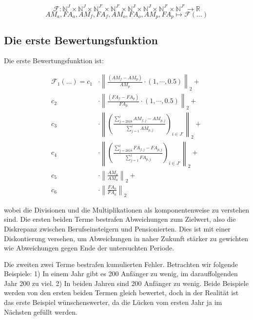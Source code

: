 \documentclass[a4paper,12pt]{article}
\begin{document}
\begin{equation*}
\mathcal F: \mathbb{N}^J \times \mathbb{N}^J \times \mathbb{N}^{J'} \times \mathbb{N}^{J'} \times \mathbb{N}^{J} \times \mathbb{N}^{J} \times \mathbb{N}^{J'} \times \mathbb{N}^{J'} \rightarrow \mathbb R
\end{equation*}
\begin{equation*}
AM_a, FA_a, AM_f, FA_f, AM_o, FA_o, AM_p, FA_p \mapsto \mathcal F(\hdots)
\end{equation*}




\subsection{Die erste Bewertungsfunktion}

Die erste Bewertungsfunktion ist:

\begin{align*}
\mathcal F_1(\hdots) = c_1 &\cdot \left\| \frac{(AM_f - AM_p)}{AM_p} \cdot (1, \cdots, 0.5)  \right\|_2 + \\
			  c_2 &\cdot \left\| \frac{(FA_f - FA_p)}{FA_p} \cdot (1, \cdots, 0.5)  \right\|_2  +\\
			  c_3 &\cdot \left\| \left( \frac{ \sum\nolimits_{j=2018}^i AM_{f,j} - AM_{p,j} }{\sum\nolimits_{j=1}^i AM_{p,j} } \right)_{i\in J'} \right\|_2 +\\
			  c_4 &\cdot \left\| \left( \frac{ \sum\nolimits_{j=2018}^i FA_{f,j} - FA_{p,j} }{\sum\nolimits_{j=1}^i FA_{p,j} } \right)_{i\in J'} \right\|_2 +\\
			  c_5 &\cdot \left\| \frac{AM_o}{AM_a} \right\|_2 +\\
			  c_6 &\cdot \left\| \frac{FA_o}{FA_a} \right\|_2 
\end{align*}

wobei die Divisionen und die Multiplikationen als komponentenweise zu verstehen sind. Die ersten beiden Terme bestrafen Abweichungen zum Zielwert, also die Diskrepanz zwischen Berufseinsteigern und Pensionierten. Dies ist mit einer Diskontierung versehen, um Abweichungen in naher Zukunft stärker zu gewichten wie Abweichungen gegen Ende der untersuchten Periode. 

Die zweiten zwei Terme bestrafen kumulierten Fehler. Betrachten wir folgende Beispiele: 1) In einem Jahr gibt es 200 Anfänger zu wenig, im darauffolgenden Jahr 200 zu viel. 2) In beiden Jahren sind 200 Anfänger zu wenig. Beide Beispiele werden von den ersten beiden Termen gleich bewertet, doch in der Realität ist das erste Beispiel wünschenswerter, da die Lücken vom ersten Jahr ja im Nächsten gefüllt werden. 
\end{document}
